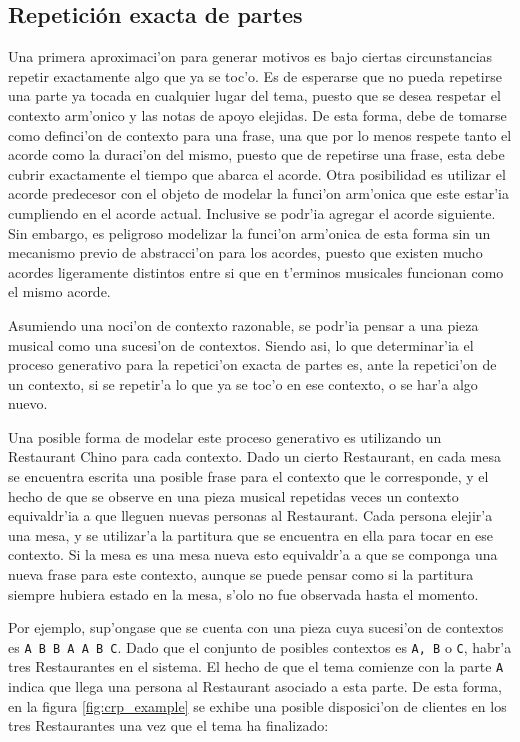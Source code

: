 \subsection{Repetici\'on exacta de partes}
\label{sec:crp_model}
Una primera aproximaci'on para generar motivos es bajo ciertas circunstancias repetir exactamente algo que ya se toc'o. Es de esperarse que no pueda repetirse
una parte ya tocada en cualquier lugar del tema, puesto que se desea respetar el contexto arm'onico y las notas de apoyo elejidas. De esta forma, debe
de tomarse como definci'on de contexto para una frase, una que por lo menos respete tanto el acorde como la duraci'on del mismo, puesto que de repetirse una frase, esta 
debe cubrir exactamente el tiempo que abarca el acorde. Otra posibilidad es utilizar el acorde predecesor con el objeto
de modelar la funci'on arm'onica que este estar'ia cumpliendo en el acorde actual. Inclusive se podr'ia agregar el acorde siguiente. Sin embargo, es peligroso modelizar
la funci'on arm'onica de esta forma sin un mecanismo previo de abstracci'on para los acordes, puesto que existen mucho acordes ligeramente distintos entre si que en t'erminos
musicales funcionan como el mismo acorde.

Asumiendo una noci'on de contexto razonable, se podr'ia pensar a una pieza musical como una sucesi'on de contextos. Siendo asi, lo que determinar'ia el proceso generativo para 
la repetici'on exacta de partes es, ante la repetici'on de un contexto, si se repetir'a lo que ya se toc'o en ese contexto, o se har'a
algo nuevo. 

Una posible forma de modelar este proceso generativo es utilizando un Restaurant Chino para cada contexto. Dado un cierto Restaurant, en cada mesa se encuentra
escrita una posible frase para el contexto que le corresponde, y el hecho de que se observe en una pieza musical repetidas veces un contexto equivaldr'ia a que lleguen nuevas
personas al Restaurant. Cada persona elejir'a una mesa, y se utilizar'a la partitura que se encuentra en ella para tocar en ese contexto. Si la mesa es una mesa 
nueva esto equivaldr'a a que se componga una nueva frase para este contexto, aunque se puede pensar como si la partitura siempre hubiera estado en la mesa, s'olo 
no fue observada hasta el momento.  

Por ejemplo, sup'ongase que se cuenta con una pieza cuya sucesi'on de contextos es \texttt{A B B A A B C}. Dado que el conjunto de posibles contextos es
\texttt{A, B} o \texttt{C}, habr'a tres Restaurantes en el sistema. El hecho de que el tema comienze con la parte \texttt{A} indica que llega una persona al 
Restaurant asociado a esta parte. De esta forma, en la figura \ref{fig:crp_example} se exhibe una posible disposici'on de clientes en los tres Restaurantes 
una vez que el tema ha finalizado:

